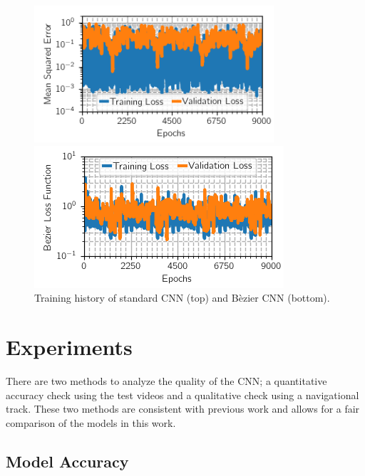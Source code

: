 \documentclass[conference]{IEEEtran}
\begin{document}
\begin{figure}[bt]
	\centerline{\includegraphics[width=3.5in]{../figures/final-report/cnn-i2p-th}}
	\centerline{\includegraphics{../figures/final-report/cnn-i2c-th}}
	\caption{Training history of standard CNN (top) and B\`ezier CNN (bottom).}
	\label{fig:th}
\end{figure}

\section{Experiments}

There are two methods to analyze the quality of the CNN; a quantitative accuracy check using the test videos and a qualitative check using a navigational track. These two methods are consistent with previous work \cite{bechtel2018} and allows for a fair comparison of the models in this work.

\subsection{Model Accuracy}
\end{document}
